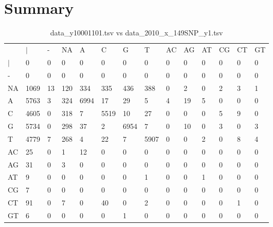 \section{Summary} \label{section_summary}
\begin{center}
\begin{longtable}{|l|l|l|l|l|l|l|l|l|l|l|l|l|l|}
\caption{data\_y10001101.tsv vs data\_2010\_x\_149SNP\_y1.tsv} \label{table_dm0}\\
\hline
\\
\hline
&$|$&-&NA&A&C&G&T&AC&AG&AT&CG&CT&GT\\
$|$&0&0&0&0&0&0&0&0&0&0&0&0&0\\
-&0&0&0&0&0&0&0&0&0&0&0&0&0\\
NA&1069&13&120&334&335&436&388&0&2&0&2&3&1\\
A&5763&3&324&6994&17&29&5&4&19&5&0&0&0\\
C&4605&0&318&7&5519&10&27&0&0&0&5&9&0\\
G&5734&0&298&37&2&6954&7&0&10&0&3&0&3\\
T&4779&7&268&4&22&7&5907&0&0&2&0&8&4\\
AC&25&0&1&12&0&0&0&0&0&0&0&0&0\\
AG&31&0&3&0&0&0&0&0&0&0&0&0&0\\
AT&9&0&0&0&0&0&1&0&0&1&0&0&0\\
CG&7&0&0&0&0&0&0&0&0&0&0&0&0\\
CT&91&0&7&0&40&0&2&0&0&0&0&1&0\\
GT&6&0&0&0&0&1&0&0&0&0&0&0&0\\
\hline
\end{longtable}
\end{center}

